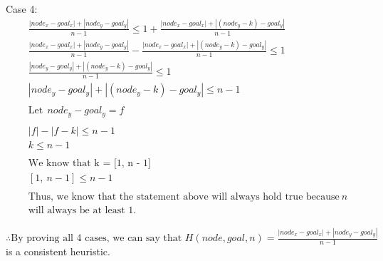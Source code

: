 \documentclass[a4paper]{article}
\begin{document}
\begin{sloppypar}
\begin{enumerate}[start=6,label=Q\arabic*,left=0pt]
    Case 4:
    \begin{align*}
        &\frac{|node_x - goal_x| + |node_y - goal_y|}{n - 1} \leq 1 + \frac{|node_x - goal_x| + |(node_y - k) - goal_y|}{n - 1} \\
        &\frac{|node_x - goal_x| + |node_y - goal_y|}{n - 1} - \frac{|node_x - goal_x| + |(node_y - k) - goal_y|}{n - 1} \leq 1 \\
        &\frac{|node_y - goal_y| + |(node_y - k) - goal_y|}{n - 1} \leq 1 \\
        &|node_y - goal_y| + |(node_y - k) - goal_y| \leq n - 1 \\\\
        &\text{Let} \:\: node_y - goal_y = f \\\\
        &|f| - |f - k| \leq n - 1 \\
        &k \leq n - 1 \\\\
        &\text{We know that k = [1, n - 1]} \\
        &[1, \: n - 1] \leq n - 1 \\\\
        &\text{Thus, we know that the statement above will always hold true because} \: n \: \\
        &\text{will always be at least 1.}
    \end{align*} 

    $\therefore \text{By proving all 4 cases, we can say that } H(node, goal, n) = \frac{|node_x - goal_x| + |node_y - goal_y|}{n - 1}$ \\ 
    is a consistent heuristic.
    

\end{enumerate}
\end{sloppypar}
\end{document}
